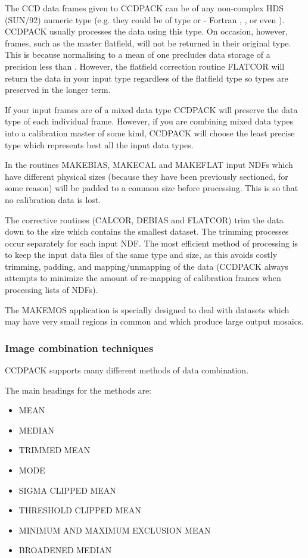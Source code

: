 The CCD data frames given to CCDPACK can be of any non-complex HDS
(SUN/92) numeric type (e.g. they could be of type  or 
 - Fortran , ,
 or even  ). CCDPACK usually processes
the data using this type. On occasion, however, frames, such as the
master flatfield, will not be returned in their original type. This is
because normalising to a mean of one precludes data storage of a
precision less than . However, the flatfield correction routine
FLATCOR will return the data in your input type regardless of the
flatfield type so types are preserved in the longer term.

If your input frames are of a mixed data type CCDPACK will preserve the data
type of each individual frame. However, if you are combining mixed data types
into a calibration master of some kind, CCDPACK will choose the least precise
type which represents best all the input data types.

In the routines MAKEBIAS, MAKECAL and MAKEFLAT input NDFs which have
different physical sizes (because they have been previously sectioned,
for some reason) will be padded to a common size before processing. This
is so that no calibration data is lost. 

The corrective routines (CALCOR, DEBIAS and FLATCOR) trim the data down
to the size which contains the smallest dataset. The trimming processes
occur separately for each input NDF. The most efficient method of
processing is to keep the input data files of the same type and size, as
this avoids costly trimming, padding, and mapping/unmapping of the data
(CCDPACK always attempts to minimize the amount of re-mapping of
calibration frames when processing lists of NDFs).

The MAKEMOS application is specially designed to deal with datasets
which may have very small regions in common and which produce large 
output mosaics.

\subsubsection{Image combination techniques}
\label{combinations}

CCDPACK supports many different methods of data combination.

The main headings for the methods are:

\begin{itemize}
\item MEAN
\item MEDIAN
\item TRIMMED MEAN
\item MODE
\item SIGMA CLIPPED MEAN
\item THRESHOLD CLIPPED MEAN
\item MINIMUM AND MAXIMUM EXCLUSION MEAN
\item BROADENED MEDIAN
\end{itemize}


